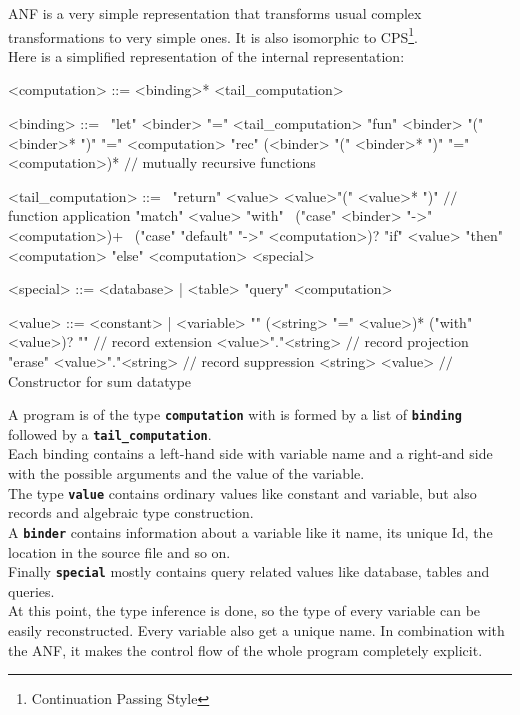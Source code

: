 \documentclass[11pt]{article}
\newcommand\sig[1]{{\tt\bf #1}}
\renewcommand\comment[1]{{\color{gray} $//$ #1}}
\begin{document}
ANF is a very simple representation that transforms usual complex transformations to very simple ones. It is also isomorphic to CPS\footnote{Continuation Passing Style}.\\

Here is a simplified representation of the internal representation:

\begin{grammar}
<computation> ::= <binding>* <tail_computation>

<binding> ::= \
\alt "let" <binder> "=" <tail_computation>
\alt "fun" <binder> "(" <binder>* ")" "=" <computation>
\alt "rec" (<binder> "(" <binder>* ")" "=" <computation>)* \comment{mutually recursive functions}

<tail_computation> ::= \ 
\alt "return" <value>
\alt <value>"(" <value>* ")" \comment{function application}
\alt "match" <value> "with" \ 
  ("case" <binder> "->" <computation>)+ \ 
  ("case" "default" "->" <computation>)?
\alt "if" <value> "then" <computation> "else" <computation>
\alt <special>

<special> ::= <database> | <table>
\alt "query" <computation>

<value> ::= <constant> | <variable>
\alt "{" (<string> "=" <value>)* ("with" <value>)? "}" \comment{record extension}
\alt <value>"."<string> \comment{record projection}
\alt "erase" <value>"."<string> \comment{record suppression}
\alt <string> <value> \comment{Constructor for sum datatype}
\end{grammar}


A program is of the type \sig{computation} with is formed by a list of \sig{binding} followed by a \sig{tail\_computation}.\\
Each binding contains a left-hand side with variable name and a right-and side with the possible arguments and the value of the variable. \\
The type \sig{value} contains ordinary values like constant and variable, but also records and algebraic type construction.\\
A \sig{binder} contains information about a variable like it name, its unique Id, the location in the source file and so on.\\
Finally \sig{special} mostly contains query related values like database, tables and queries.\\

At this point, the type inference is done, so the type of every variable can be easily reconstructed. Every variable also get a unique name. In combination with the ANF, it makes the control flow of the whole program completely explicit.\\
\end{document}
